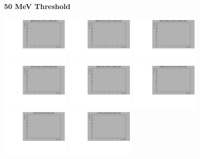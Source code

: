 \textbf{50 MeV Threshold}

\begin{center}

  \includegraphics[width=0.245\textwidth]{plots/response_matrix/Proton_KE_FHC_CC0Pi_50MeV.pdf}
  \includegraphics[width=0.245\textwidth]{plots/response_matrix/PiPlus_KE_FHC_CC0Pi_50MeV.pdf}
  \includegraphics[width=0.245\textwidth]{plots/response_matrix/PiMinus_KE_FHC_CC0Pi_50MeV.pdf}
  \includegraphics[width=0.245\textwidth]{plots/response_matrix/Charged_Pi_KE_FHC_CC0Pi_50MeV.pdf}
  \includegraphics[width=0.245\textwidth]{plots/response_matrix/Pi0_KE_FHC_CC0Pi_50MeV.pdf}
  \includegraphics[width=0.245\textwidth]{plots/response_matrix/Proton+Pion_KE_FHC_CC0Pi_50MeV.pdf}
  \includegraphics[width=0.245\textwidth]{plots/response_matrix/Total_FHC_CC0Pi_50MeV.pdf}
  \includegraphics[width=0.245\textwidth]{plots/response_matrix/Hadrons_FHC_CC0Pi_50MeV.pdf}

\end{center}

